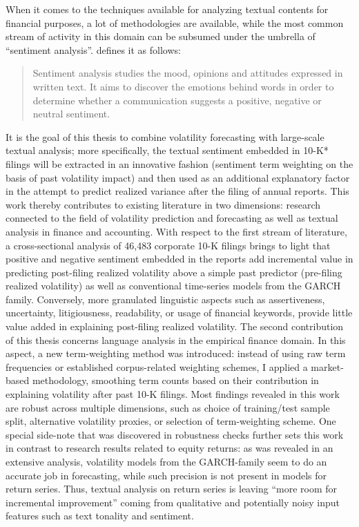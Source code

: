 
When it comes to the techniques available for analyzing textual contents for financial purposes, a lot of methodologies are available, while the most common stream of activity in this domain can be subsumed under the umbrella of \enquote{sentiment analysis}. \textcite{RMM_2015} defines it as follows:
\blockquote{Sentiment analysis studies the mood, opinions and attitudes expressed in written text. It aims to discover the emotions behind words in order to determine whether a communication suggests a positive, negative or neutral sentiment.}

It is the goal of this thesis to combine volatility forecasting with large-scale textual analysis; more specifically, the textual sentiment embedded in 10-K* filings will be extracted in an innovative fashion (sentiment term weighting on the basis of past volatility impact) and then used as an additional explanatory factor in the attempt to predict realized variance after the filing of annual reports. This work thereby contributes to existing literature in two dimensions: research connected to the field of volatility prediction and forecasting as well as textual analysis in finance and accounting. With respect to the first stream of literature, a cross-sectional analysis of 46,483 corporate 10-K filings brings to light that positive and negative sentiment embedded in the reports add incremental value in predicting post-filing realized volatility above a simple past predictor (pre-filing realized volatility) as well as conventional time-series models from the GARCH family. Conversely, more granulated linguistic aspects such as assertiveness, uncertainty, litigiousness, readability, or usage of financial keywords, provide little value added in explaining post-filing realized volatility. The second contribution of this thesis concerns language analysis in the empirical finance domain. In this aspect, a new term-weighting method was introduced: instead of using raw term frequencies or established corpus-related weighting schemes, I applied a market-based methodology, smoothing term counts based on their contribution in explaining volatility after past 10-K filings. Most findings revealed in this work are robust across multiple dimensions, such as choice of training/test sample split, alternative volatility proxies, or selection of term-weighting scheme. One special side-note that was discovered in robustness checks further sets this work in contrast to research results related to equity returns: as was revealed in an extensive analysis, volatility models from the GARCH-family seem to do an accurate job in forecasting, while such precision is not present in models for return series. Thus, textual analysis on return series is leaving \enquote{more room for incremental improvement} coming from qualitative and potentially noisy input features such as text tonality and sentiment.

